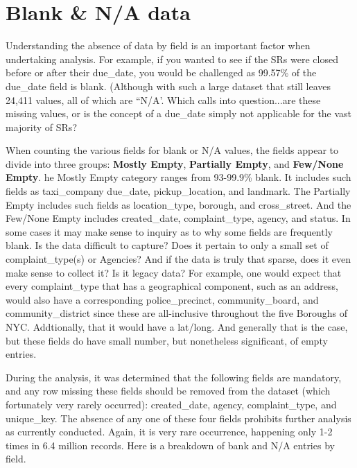 \documentclass[12pt, titlepage]{article}
\begin{document}
 

\section{Blank \& N/A data}\label{sec:blanks}

Understanding the absence of data by field is an important factor when undertaking analysis. For example, if you wanted to see if the SRs were
closed before or after their due\_date, you would be challenged as 99.57\% of the due\_date field is blank. (Although with such a large dataset
that still leaves 24,411 values, all of which are ``N/A'. Which calls into question...are these missing values, or is the concept of a
due\_date simply not applicable for the vast majority of SRs?

When counting the various fields for blank or N/A values, the fields appear to divide into three groups: \textbf{Mostly Empty}, \textbf{Partially Empty}, 
and \textbf{Few/None Empty}. he Mostly Empty category ranges from 93-99.9\% blank. It includes such fields as taxi\_company due\_date, pickup\_location, and landmark. The Partially 
Empty includes such fields as location\_type, borough, and cross\_street. And the Few/None Empty includes created\_date, complaint\_type, agency, and status.
In some cases it may make sense to inquiry as to why some fields are frequently blank. Is the data difficult to capture? Does it pertain to only a small set
of complaint\_type(s) or Agencies? And if the data is truly that sparse, does it even make sense to collect it? Is it legacy data? For example, one would expect that every complaint\_type
that has a geographical component, such as an address, would also have a corresponding police\_precinct, community\_board, and community\_district since these
are all-inclusive throughout the five Boroughs of NYC. Addtionally, that it would have a lat/long. And generally that is the case, but these fields do have small number, but nonetheless significant, 
of empty entries. 

During the analysis, it was determined that the following fields are mandatory, and any row missing these fields should be removed from the dataset (which fortunately
very rarely occurred): created\_date, agency, complaint\_type, and unique\_key. The absence of any one of these four fields prohibits further analysis  as currently conducted. Again,
it is very rare occurrence, happening only 1-2 times in 6.4 million records. Here is a breakdown of bank and N/A entries by field.
\end{document}
